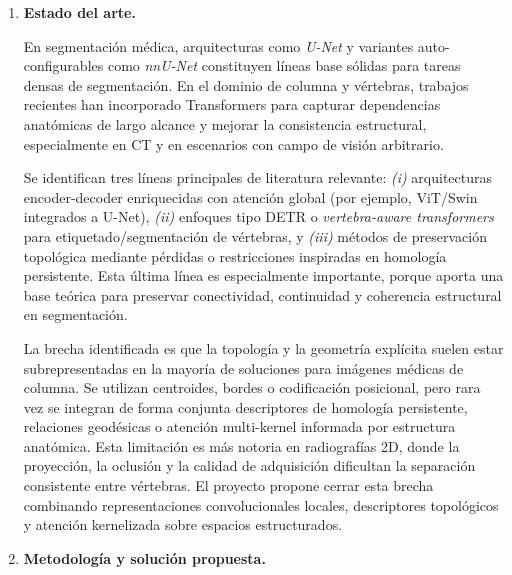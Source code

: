\documentclass[8pt,a4paper]{article}
\begin{document}
\begin{enumerate}[leftmargin=0.8cm,label=\arabic*.,itemsep=0.85em]
    \item \textbf{Estado del arte.}

    En segmentación médica, arquitecturas como \textit{U-Net} y variantes auto-configurables como \textit{nnU-Net} constituyen líneas base sólidas para tareas densas de segmentación. En el dominio de columna y vértebras, trabajos recientes han incorporado Transformers para capturar dependencias anatómicas de largo alcance y mejorar la consistencia estructural, especialmente en CT y en escenarios con campo de visión arbitrario.

    Se identifican tres líneas principales de literatura relevante: \textit{(i)} arquitecturas encoder-decoder enriquecidas con atención global (por ejemplo, ViT/Swin integrados a U-Net), \textit{(ii)} enfoques tipo DETR o \textit{vertebra-aware transformers} para etiquetado/segmentación de vértebras, y \textit{(iii)} métodos de preservación topológica mediante pérdidas o restricciones inspiradas en homología persistente. Esta última línea es especialmente importante, porque aporta una base teórica para preservar conectividad, continuidad y coherencia estructural en segmentación.

    La brecha identificada es que la topología y la geometría explícita suelen estar subrepresentadas en la mayoría de soluciones para imágenes médicas de columna. Se utilizan centroides, bordes o codificación posicional, pero rara vez se integran de forma conjunta descriptores de homología persistente, relaciones geodésicas o atención multi-kernel informada por estructura anatómica. Esta limitación es más notoria en radiografías 2D, donde la proyección, la oclusión y la calidad de adquisición dificultan la separación consistente entre vértebras. El proyecto propone cerrar esta brecha combinando representaciones convolucionales locales, descriptores topológicos y atención kernelizada sobre espacios estructurados.

    \item \textbf{Metodología y solución propuesta.}


\end{enumerate}
\end{document}
